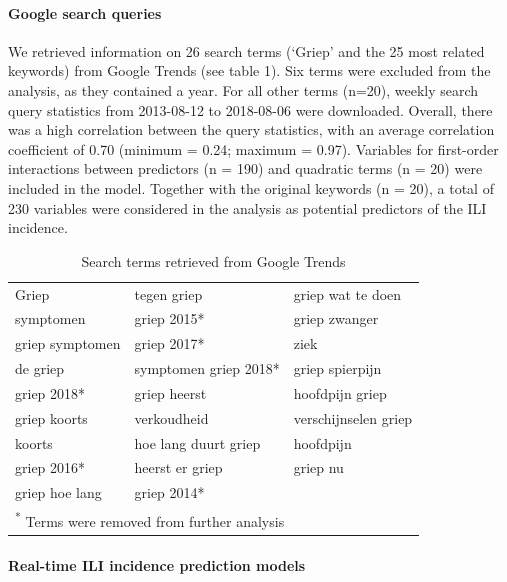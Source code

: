 \documentclass[]{article}
\let\oldparagraph\paragraph
\renewcommand{\paragraph}[1]{\oldparagraph{#1}\mbox{}}
\begin{document}
\hypertarget{google-search-queries}{%
\paragraph{\texorpdfstring{\textbf{Google search
queries}}{Google search queries}}\label{google-search-queries}}

We retrieved information on 26 search terms (`Griep' and the 25 most
related keywords) from Google Trends (see table 1). Six terms were
excluded from the analysis, as they contained a year. For all other
terms (n=20), weekly search query statistics from 2013-08-12 to
2018-08-06 were downloaded. Overall, there was a high correlation
between the query statistics, with an average correlation coefficient of
0.70 (minimum = 0.24; maximum = 0.97). Variables for first-order
interactions between predictors (n = 190) and quadratic terms (n = 20)
were included in the model. Together with the original keywords (n =
20), a total of 230 variables were considered in the analysis as
potential predictors of the ILI incidence.

\begin{table}

\caption{Search terms retrieved from Google Trends}
\centering
\begin{tabular}[t]{lll}
\toprule
Griep & tegen griep & griep wat te doen\\
symptomen & griep 2015* & griep zwanger\\
griep symptomen & griep 2017* & ziek\\
de griep & symptomen griep 2018* & griep spierpijn\\
griep 2018* & griep heerst & hoofdpijn griep\\
\addlinespace
griep koorts & verkoudheid & verschijnselen griep\\
koorts & hoe lang duurt griep & hoofdpijn\\
griep 2016* & heerst er griep & griep nu\\
griep hoe lang & griep 2014* & \\
\bottomrule
\multicolumn{3}{l}{\textsuperscript{*} Terms were removed from further analysis}\\
\end{tabular}
\end{table}

\hypertarget{real-time-ili-incidence-prediction-models}{%
\paragraph{\texorpdfstring{\textbf{Real-time ILI incidence prediction
models}}{Real-time ILI incidence prediction models}}\label{real-time-ili-incidence-prediction-models}}
\end{document}
